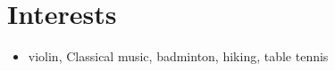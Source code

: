 \documentclass[letterpaper]{article}
\begin{document}
% 
% 

\section*{Interests}
\begin{itemize}
\item violin, Classical music, badminton, hiking, table tennis
\end{itemize}

\bigskip
\begin{center}
    \begin{footnotesize}
    \end{footnotesize}
\end{center}
\end{document}
